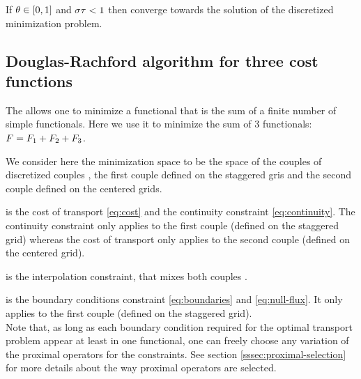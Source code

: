         If $\theta\in[0,1]$ and $\sigma\tau<1$ then  converge towards the solution of the 
        discretized minimization problem.

    \subsection{Douglas-Rachford algorithm for three cost functions}
    \noindent

        The \drAlgo{} allows one to minimize a functional \costToMin that is the sum of a finite number of simple
        functionals. Here we use it to minimize the sum of $3$ functionals:
        $F=F_1+F_2+F_3$.

        We consider here the minimization space to be the space of the couples of discretized couples \coupleFM{},
        the first couple defined on the staggered gris and the second couple defined on the centered grids.

        \costIToMin{} is
        the cost of transport \eqref{eq:cost} and the continuity constraint \eqref{eq:continuity}. The continuity
        constraint only applies to the first couple \coupleFM{} (defined on the staggered grid) whereas the cost of transport
        only applies to the second couple \coupleFM{} (defined on the centered grid).

        \costIIToMin{} is the interpolation constraint, that mixes both couples \coupleFM{}.

        \costIIIToMin{} is the boundary conditions constraint \eqref{eq:boundaries} and \eqref{eq:null-flux}. It only
        applies to the first couple \coupleFM{} (defined on the staggered grid).\\

        Note that, as long as each boundary condition required for the optimal transport problem appear at least in one functional, 
        one can freely choose any variation of the proximal operators for the constraints. See section \ref{sssec:proximal-selection}
        for more details about the way proximal operators are selected.\\

